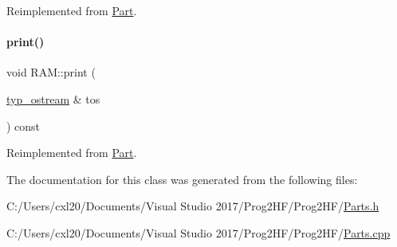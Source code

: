 Reimplemented from \mbox{\hyperlink{class_part_aa602d876151b63db72cf8f666847a8cd}{Part}}.

\mbox{\label{class_r_a_m_ad43f71c742f078c98ab7fd9a26420c97}} 
\paragraph{\texorpdfstring{print()}{print()}\hspace{0.1cm}{\footnotesize\ttfamily [4/4]}}
{\footnotesize\ttfamily void R\+A\+M\+::print (\begin{DoxyParamCaption}\item[{\mbox{\hyperlink{structtyp__ostream}{typ\+\_\+ostream}} \&}]{tos }\end{DoxyParamCaption}) const\hspace{0.3cm}{\ttfamily [virtual]}}



Reimplemented from \mbox{\hyperlink{class_part_ab6396030e8b7a724731a8b54bd4942fc}{Part}}.



The documentation for this class was generated from the following files\+:\begin{DoxyCompactItemize}
\item 
C\+:/\+Users/cxl20/\+Documents/\+Visual Studio 2017/\+Prog2\+H\+F/\+Prog2\+H\+F/\mbox{\hyperlink{_parts_8h}{Parts.\+h}}\item 
C\+:/\+Users/cxl20/\+Documents/\+Visual Studio 2017/\+Prog2\+H\+F/\+Prog2\+H\+F/\mbox{\hyperlink{_parts_8cpp}{Parts.\+cpp}}\end{DoxyCompactItemize}
